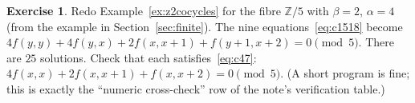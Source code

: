 \documentclass[11pt]{article}
\theoremstyle{definition}\newtheorem{example}{Example}\newtheorem{exercise}{Exercise}
\theoremstyle{remark}\newtheorem*{remark}{Remark}
\newcommand{\Z}{\mathbb{Z}}
\begin{document}
\begin{exercise}
Redo Example~\ref{ex:z2cocycles} for the fibre $\Z/5$ with $\beta=2$, $\alpha=4$ (from the example in Section~\ref{sec:finite}). The nine equations~\eqref{eq:c1518} become $4f(y,y)+4f(y,x)+2f(x,x+1)+f(y+1,x+2)=0 \pmod 5$. There are $25$ solutions. Check that each satisfies~\eqref{eq:c47}: $4f(x,x)+2f(x,x+1)+f(x,x+2)=0 \pmod 5$. (A short program is fine; this is exactly the ``numeric cross-check'' row of the note's verification table.)
\end{exercise}
\end{document}
